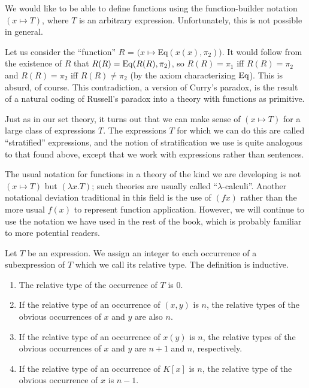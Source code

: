 We would like to be able to define functions using the
function-builder notation $(x \mapsto T)$,
where $T$ is an arbitrary
expression.  Unfortunately, this is not possible in general.

Let us consider the ``function'' $R$ = $(x \mapsto $Eq$(x(x),\pi_2))$.  It
would follow from the existence of $R$ that $R(R) = \mathop{\mathrm{Eq}}(R(R),\pi_2)$,
so $R(R) = \pi_1$ iff $R(R)=\pi_2$ and $R(R) = \pi_2$ iff $R(R) \neq
\pi_2$ (by the axiom characterizing $\mathop{\mathrm{Eq}}$).  This is absurd, of course.
This contradiction, a version of Curry's paradox, is the
result of a 
natural coding of Russell's paradox into a theory with
functions as primitive.

Just as in our set theory, it turns out that we can make sense of $(x
\mapsto T)$ for a large class of expressions $T$.  The expressions $T$ for
which we can do this are called ``stratified''
expressions, and the notion of stratification we use is quite analogous to that
found above, except that we work with expressions rather than sentences.

The usual notation for functions in a theory of the kind we are
developing is not $(x \mapsto T)$ but $(\lambda x.T)$; such theories
are usually called ``$\lambda$-calculi''.  Another notational
deviation traditional in this field is the use of $(fx)$ rather than
the more usual $f(x)$ to represent function application.  However, we
will continue to use the notation we have used in the rest of the
book, which is probably familiar to more potential readers.

\begin{definition}
 Let $T$ be an expression.  We assign an integer to each
 occurrence of a subexpression of $T$ which we call its {\upshape relative
 type}.
 The definition is inductive.
 \begin{enumerate}
  \item  The relative type of the occurrence of $T$ is 0.
  \item If the relative type of an occurrence of $(x,y)$ is $n$, the
    relative types of the obvious occurrences of $x$
    and $y$ are also $n$. 
  \item If the relative type of an occurrence of $x(y)$ is $n$, the
    relative types of the obvious occurrences of $x$ and $y$ are $n+1$ and
    $n$, respectively.
  \item If the relative type of an occurrence of $K[x]$ is $n$, the
    relative type of the obvious occurrence of $x$ is $n-1$.
 \end{enumerate}
\end{definition}

